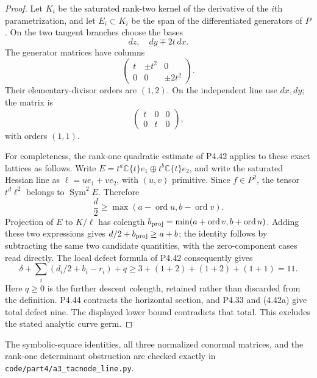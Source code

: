 \begin{proof}
Let $K_i$ be the saturated rank-two kernel of the derivative
of the $i$th parametrization, and let $E_i\subset K_i$ be
the span of the differentiated generators of $P$. On the
two tangent branches choose the bases
\[
                dz,\quad dy\mp2t\,dx.
\]
The generator matrices have columns
\[
 \begin{pmatrix}t&\pm t^2&0\\0&0&\pm2t^2\end{pmatrix}.
\]
Their elementary-divisor orders are $(1,2)$. On the
independent line use $dx,dy$; the matrix is
\[
                   \begin{pmatrix}t&0&0\\0&t&0\end{pmatrix},
\]
with orders $(1,1)$.

For completeness, the rank-one quadratic estimate of
P4.42 applies to these exact lattices as follows. Write
$E=t^a\mathbb C\{t\}e_1\oplus
t^b\mathbb C\{t\}e_2$, and write the saturated Hessian
line as $\ell=u e_1+v e_2$, with $(u,v)$ primitive.
Since $f\in P^2$, the tensor $t^d\ell^2$ belongs to
$\operatorname{Sym}^2E$. Therefore
\[
 \frac d2\ge\max(a-\operatorname{ord}u,
                         b-\operatorname{ord}v).
\]
Projection of $E$ to $K/\ell$ has colength
$b_{\rm proj}=\min(a+\operatorname{ord}v,
b+\operatorname{ord}u)$. Adding these two expressions
gives $d/2+b_{\rm proj}\ge a+b$; the identity follows
by subtracting the same two candidate quantities, with
the zero-component cases read directly. The local defect
formula of P4.42 consequently gives
\[
 \delta+\sum_i(d_i/2+b_i-r_i)+q
       \ge3+(1+2)+(1+2)+(1+1)=11.
\]
Here $q\ge0$ is the further descent colength, retained
rather than discarded from the definition. P4.44 contracts
the horizontal section, and P4.33 and (4.42a) give total
defect nine. The displayed lower bound contradicts that
total. This excludes the stated analytic curve germ.
\end{proof}

The symbolic-square identities, all three normalized
conormal matrices, and the rank-one determinant obstruction
are checked exactly in
\texttt{code/part4/a3\_tacnode\_line.py}.
